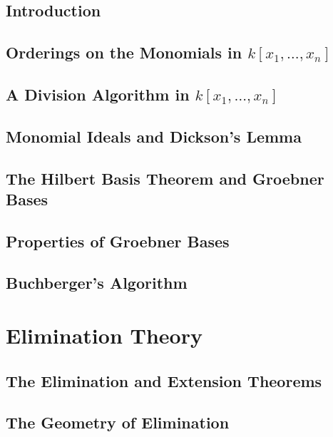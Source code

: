 \documentclass[10pt]{amsart}
\begin{document}
\begin{multicols*}{2}
\subsection{Introduction}




\subsection{Orderings on the Monomials in $k[x_1, \dots , x_n]$ }




\subsection{A Division Algorithm in $k[x_1, \dots , x_n ]$ }



\subsection{Monomial Ideals and Dickson's Lemma }


\subsection{The Hilbert Basis Theorem and Groebner Bases}


\subsection{Properties of Groebner Bases}



\subsection{Buchberger's Algorithm}






\section{Elimination Theory}



\subsection{The Elimination and Extension Theorems}


\subsection{The Geometry of Elimination}




\end{multicols*}
\end{document}
